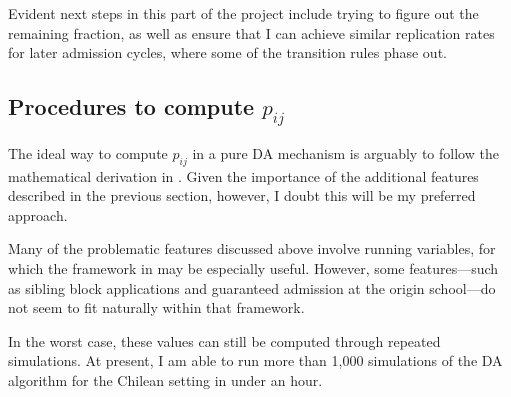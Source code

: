 \documentclass[a4paper, article, english, oneside, unknownkeysallowed, 12pt]{memoir}
\begin{document}
Evident next steps in this part of the project include trying to figure out the remaining fraction, as well as ensure that I can achieve similar replication rates for later admission cycles, where some of the transition rules phase out.

\subsection{Procedures to compute $p_{ij}$}

The ideal way to compute $p_{ij}$ in a pure DA mechanism is arguably to follow the mathematical derivation in \textcite{abdulkadiroglu_research_2017}. Given the importance of the additional features described in the previous section, however, I doubt this will be my preferred approach.

Many of the problematic features discussed above involve running variables, for which the framework in \textcite{abdulkadiroglu_breaking_2022} may be especially useful. However, some features---such as sibling block applications and guaranteed admission at the origin school---do not seem to fit naturally within that framework.

In the worst case, these values can still be computed through repeated simulations. At present, I am able to run more than 1,000 simulations of the DA algorithm for the Chilean setting in under an hour.

\clearpage
\printbibliography
\end{document}
